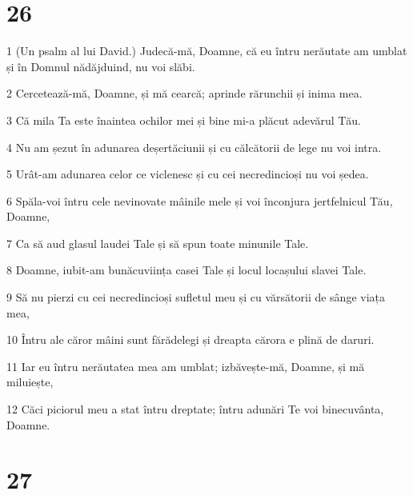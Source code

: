 \chapter{26}

\par 1 (Un psalm al lui David.) Judecă-mă, Doamne, că eu întru nerăutate am umblat și în Domnul nădăjduind, nu voi slăbi.
\par 2 Cercetează-mă, Doamne, și mă cearcă; aprinde rărunchii și inima mea.
\par 3 Că mila Ta este înaintea ochilor mei și bine mi-a plăcut adevărul Tău.
\par 4 Nu am șezut în adunarea deșertăciunii și cu călcătorii de lege nu voi intra.
\par 5 Urât-am adunarea celor ce viclenesc și cu cei necredincioși nu voi ședea.
\par 6 Spăla-voi întru cele nevinovate mâinile mele și voi înconjura jertfelnicul Tău, Doamne,
\par 7 Ca să aud glasul laudei Tale și să spun toate minunile Tale.
\par 8 Doamne, iubit-am bunăcuviința casei Tale și locul locașului slavei Tale.
\par 9 Să nu pierzi cu cei necredincioși sufletul meu și cu vărsătorii de sânge viața mea,
\par 10 Întru ale căror mâini sunt fărădelegi și dreapta cărora e plină de daruri.
\par 11 Iar eu întru nerăutatea mea am umblat; izbăvește-mă, Doamne, și mă miluiește,
\par 12 Căci piciorul meu a stat întru dreptate; întru adunări Te voi binecuvânta, Doamne.

\chapter{27}

